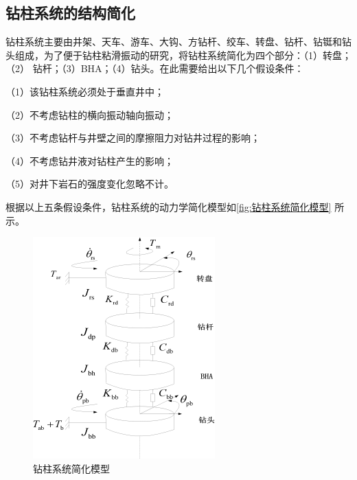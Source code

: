\documentclass[12pt,hyperref,a4paper,UTF8]{ctexart}
\begin{document}
	\subsection{钻柱系统的结构简化}
	钻柱系统主要由井架、天车、游车、大钩、方钻杆、绞车、转盘、钻杆、钻铤和钻 头组成，为了便于钻柱粘滑振动的研究，将钻柱系统简化为四个部分：（1）转盘；（2） 钻杆；（3）BHA；（4）钻头。在此需要给出以下几个假设条件：
	
	（1）该钻柱系统必须处于垂直井中；
	
	（2）不考虑钻柱的横向振动轴向振动；
	
	（3）不考虑钻杆与井壁之间的摩擦阻力对钻井过程的影响；
	
	（4）不考虑钻井液对钻柱产生的影响；
	
	（5）对井下岩石的强度变化忽略不计。
	
	根据以上五条假设条件，钻柱系统的动力学简化模型如\autoref{fig:钻柱系统简化模型} 所示。
	
	
	\begin{figure}[!htbp]
		\centering
		\includegraphics[width=0.5\linewidth]{figures/钻柱系统简化模型}
		\caption{钻柱系统简化模型}
		\label{fig:钻柱系统简化模型}
	\end{figure}
	
\end{document}
